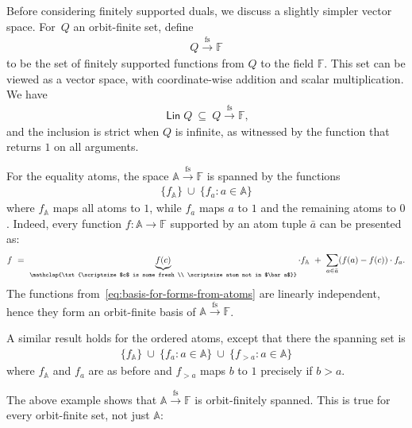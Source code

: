 \documentclass[10pt,a4paper]{amsart}
\numberwithin{equation}{section}
\newcommand{\set}[1]{\{#1\}}
\newcommand{\myunderbrace}[2]{\underbrace{#1}_{\mathclap{\txt{\scriptsize #2}}}}
\newcommand{\atoms}{\mathbb A}
\DeclareMathOperator{\lin}{\mathsf{Lin}}
\newcommand{\field}{\mathbb F}
\newcommand{\finsup}{\stackrel{\mathrm{fs}}{\to}}
\newcommand{\forms}[1]{#1 \finsup \field}
\begin{document}
Before considering finitely supported duals, we discuss a slightly simpler vector space.
For~$Q$ an orbit-finite set, define 
\begin{align*}
\forms Q
\end{align*}
to be the set of finitely supported functions from $Q$ to the field $\field$. This set can be viewed as a vector space, with coordinate-wise addition and scalar multiplication.  We have
\begin{align*}
\lin Q\   \subseteq \   \forms Q,
\end{align*}
and the inclusion is strict when $Q$ is infinite, as witnessed by the function that returns $1$ on all arguments. 


\begin{example}\label{ex:forms-atoms}
    For the equality atoms,
    the space $\forms \atoms$ is spanned by the functions 
    \begin{align}\label{eq:basis-for-forms-from-atoms}
    \set{f_\atoms} \ \cup \ \set{f_a : a \in \atoms}
    \end{align}
    where $f_\atoms$ maps all atoms to $1$, while $f_a$ maps $a$ to $1$ and the remaining atoms to $0$.
    Indeed, every function $f : \atoms \to \field$ supported by an atom tuple $\bar a$ can be presented as: 
    \begin{align*}
    f \ = \ \myunderbrace{f(c)}{$c$ is some fresh \\ \scriptsize atom not in $\bar a$} \cdot f_\atoms \ + \ \sum_{a \in \bar a} (f(a) - f(c)) \cdot f_a.
    \end{align*}
   The functions from~\eqref{eq:basis-for-forms-from-atoms}  are linearly independent, hence they form an orbit-finite basis of $\forms \atoms$.
    
A similar result holds for the ordered atoms, except that there the spanning set is
  \begin{align*}\label{eq:basis-for-forms-from-atoms-ordered}
    \set{f_\atoms} \ \cup \ \set{f_a : a \in \atoms} \ \cup \ \set{f_{> a} : a \in \atoms}
    \end{align*}
    where $f_\atoms$ and $f_a$ are as before and $f_{>a}$ maps $b$ to $1$ precisely if $b > a$.
\end{example}

The above example shows that $\forms \atoms$ is  orbit-finitely spanned. This is true for every orbit-finite set, not just $\atoms$:
 
\end{document}
